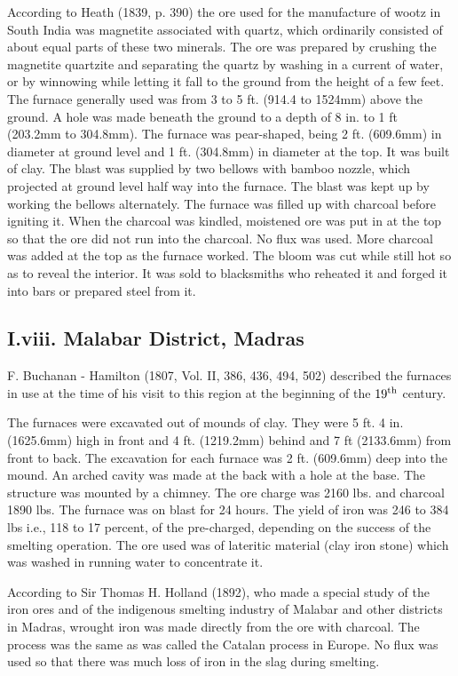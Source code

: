 According to Heath (1839, p. 390) the ore used for the manufacture of wootz in South India was magnetite associated with quartz, which ordinarily consisted of about equal parts of these two minerals. The ore was prepared by crushing the magnetite quartzite and separating the quartz by washing in a current of water, or by winnowing while letting it fall to the ground from the height of a few feet. The furnace generally used was from 3 to 5 ft. (914.4 to 1524mm) above the ground. A hole was made beneath the ground to a depth of 8 in. to 1 ft (203.2mm to 304.8mm). The furnace was pear-shaped, being 2 ft. (609.6mm) in diameter at ground level and 1 ft. (304.8mm) in diameter at the top. It was built of clay. The blast was supplied by two bellows with bamboo nozzle, which projected at ground level half way into the furnace. The blast was kept up by working the bellows alternately. The furnace was filled up with charcoal before igniting it. When the charcoal was kindled, moistened ore was put in at the top so that the ore did not run into the charcoal. No flux was used.  More charcoal was added at the top as the furnace worked.  The bloom was cut while still hot so as to reveal the interior. It was sold to blacksmiths who reheated it and forged it into bars or prepared steel from it.

\subsection*{I.viii.  Malabar District, Madras}\label{subsection-8}

F. Buchanan - Hamilton (1807, Vol. II, 386, 436, 494, 502) described the furnaces in use at the time of his visit to this region at the beginning of the $19^{\rm th}$ century.

The furnaces were excavated out of mounds of clay. They were 5 ft. 4 in. (1625.6mm) high in front and 4 ft. (1219.2mm) behind and 7 ft (2133.6mm) from front to back. The excavation for each furnace was 2 ft. (609.6mm) deep into the mound. An arched cavity was made at the back with a hole at the base. The structure was mounted by a chimney. The ore charge was 2160 lbs. and charcoal 1890 lbs. The furnace was on blast for 24 hours. The yield of iron was 246 to 384 lbs i.e., 118 to 17 percent, of the pre-charged, depending on the success of the smelting operation. The ore used was of lateritic material (clay iron stone) which was washed in running water to concentrate it. 

According to Sir Thomas H. Holland (1892), who made a special study of the iron ores and of the indigenous smelting industry of Malabar and other districts in Madras, wrought iron was made directly from the ore with charcoal. The process was the same as was called the Catalan process in Europe. No flux was used so that there was much loss of iron in the slag during smelting. 

